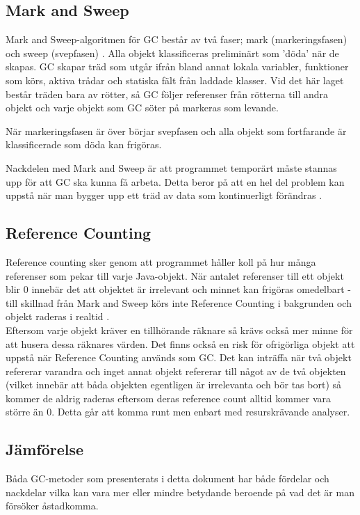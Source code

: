 \documentclass[12pt,a4paper]{article}
\begin{document}
\subsection{Mark and Sweep}
Mark and Sweep-algoritmen för GC består av två faser; mark (markeringsfasen) och sweep (svepfasen) \citep{gc0}. Alla objekt klassificeras preliminärt som 'döda' när 
de skapas. GC skapar träd som utgår ifrån bland annat lokala variabler, funktioner som körs, aktiva trådar och statiska fält 
från laddade klasser. Vid det här laget består träden bara av rötter, så GC följer referenser från rötterna till andra objekt och 
varje objekt som GC söter på markeras som levande. 

När markeringsfasen är över börjar svepfasen och alla objekt som fortfarande är klassificerade som döda kan frigöras.

Nackdelen med Mark and Sweep är att programmet temporärt måste stannas upp för att GC ska kunna få arbeta. Detta beror på att en hel del problem kan uppstå när man bygger upp ett träd av data som kontinuerligt förändras \citep{javaworld}.
\subsection{Reference Counting}
Reference counting sker genom att programmet håller koll på hur många referenser som pekar till varje Java-objekt. När antalet 
referenser till ett objekt blir 0 innebär det att objektet är irrelevant och minnet kan frigöras omedelbart - till skillnad från Mark and Sweep körs inte Reference Counting i bakgrunden och objekt raderas i realtid \citep{medium}.
\\
Eftersom varje objekt kräver en tillhörande räknare så krävs också mer minne för att husera dessa räknares värden.
Det finns också en risk för ofrigörliga objekt att uppstå när Reference Counting används som GC. Det kan inträffa när två objekt refererar varandra och 
inget annat objekt refererar till något av de två objekten (vilket innebär att båda objekten egentligen är irrelevanta och bör tas bort) så kommer de aldrig raderas eftersom deras reference count alltid kommer vara större än 0. Detta går att komma runt men enbart med resurskrävande analyser.

\subsection{Jämförelse}
Båda GC-metoder som presenterats i detta dokument har både fördelar och nackdelar vilka kan vara mer eller mindre betydande 
beroende på vad det är man försöker åstadkomma.
\end{document}
